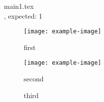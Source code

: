 \documentclass{article}
\begin{document}
{main1.tex}\\
, expected: 1\\


\begin{figure}
	\texttt{[image: example-image]}
	\caption{first}\label{fig:first}
\end{figure}

\begin{figure}
	\texttt{[image: example-image]}
	\caption{second}\label{fig:second}
\end{figure}

\begin{figure}[h]
	
	\caption{third}\label{fig:third}
\end{figure}
\end{document}
